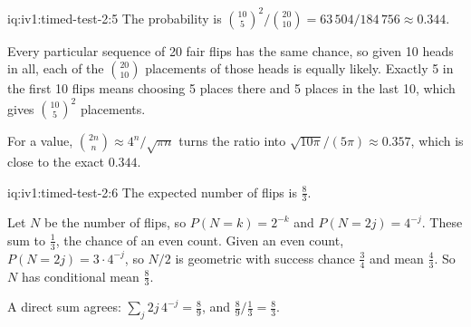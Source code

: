 \begin{solution}{iq:iv1:timed-test-2:5}
The probability is $\binom{10}{5}^2/\binom{20}{10} = 63\,504/184\,756 \approx 0.344$.

Every particular sequence of 20 fair flips has the same chance, so given 10 heads in all, each of the $\binom{20}{10}$ placements of those heads is equally likely. Exactly 5 in the first 10 flips means choosing 5 places there and 5 places in the last 10, which gives $\binom{10}{5}^2$ placements.

For a value, $\binom{2n}{n} \approx 4^n/\sqrt{\pi n}$ turns the ratio into $\sqrt{10\pi}/(5\pi) \approx 0.357$, which is close to the exact $0.344$.


\end{solution}

\begin{solution}{iq:iv1:timed-test-2:6}
The expected number of flips is $\frac83$.

Let $N$ be the number of flips, so $P(N = k) = 2^{-k}$ and $P(N = 2j) = 4^{-j}$. These sum to $\frac13$, the chance of an even count. Given an even count, $P(N = 2j) = 3 \cdot 4^{-j}$, so $N/2$ is geometric with success chance $\frac34$ and mean $\frac43$. So $N$ has conditional mean $\frac83$.

A direct sum agrees: $\sum_j 2j\,4^{-j} = \frac89$, and $\frac89 \big/ \frac13 = \frac83$.


\end{solution}

